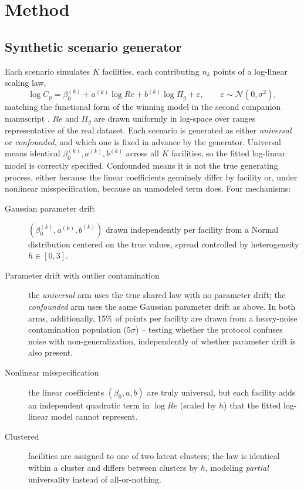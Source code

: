 \documentclass[journal=dce]{CUP-JNL-DTM}%
\begin{document}
\section{Method}

\subsection{Synthetic scenario generator}

Each scenario simulates $K$ facilities, each contributing $n_k$ points of a log-linear scaling law,
\begin{equation}
\log C_p = \beta_0^{(k)} + a^{(k)} \log Re + b^{(k)} \log \Pi_g + \varepsilon,
\qquad \varepsilon \sim \mathcal{N}(0,\sigma^2),
\end{equation}
matching the functional form of the winning model in the second companion manuscript \citep{gilruiz2026paper2}. $Re$ and $\Pi_g$ are drawn uniformly in log-space over ranges representative of the real dataset. Each scenario is generated as either \emph{universal} or \emph{confounded}, and which one is fixed in advance by the generator. Universal means identical $\beta_0^{(k)}, a^{(k)}, b^{(k)}$ across all $K$ facilities, so the fitted log-linear model is correctly specified. Confounded means it is not the true generating process, either because the linear coefficients genuinely differ by facility or, under nonlinear misspecification, because an unmodeled term does. Four mechanisms:

\begin{description}
  \item[Gaussian parameter drift] $(\beta_0^{(k)}, a^{(k)}, b^{(k)})$ drawn independently per facility from a Normal distribution centered on the true values, spread controlled by heterogeneity $h \in [0,3]$.
  \item[Parameter drift with outlier contamination] the \emph{universal} arm uses the true shared law with no parameter drift; the \emph{confounded} arm uses the same Gaussian parameter drift as above. In both arms, additionally, 15\% of points per facility are drawn from a heavy-noise contamination population ($5\sigma$) -- testing whether the protocol confuses noise with non-generalization, independently of whether parameter drift is also present.
  \item[Nonlinear misspecification] the linear coefficients $(\beta_0, a, b)$ are truly universal, but each facility adds an independent quadratic term in $\log Re$ (scaled by $h$) that the fitted log-linear model cannot represent.
  \item[Clustered] facilities are assigned to one of two latent clusters; the law is identical within a cluster and differs between clusters by $h$, modeling \emph{partial} universality instead of all-or-nothing.
\end{description}
\end{document}
